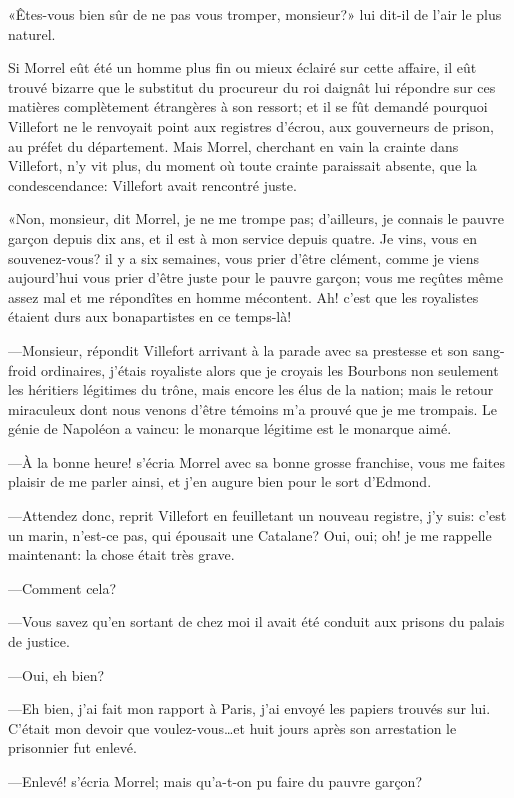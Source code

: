 «Êtes-vous bien sûr de ne pas vous tromper, monsieur?» lui dit-il de l'air le plus naturel.

Si Morrel eût été un homme plus fin ou mieux éclairé sur cette affaire, il eût trouvé bizarre que le substitut du procureur du roi daignât lui répondre sur ces matières complètement étrangères à son ressort; et il se fût demandé pourquoi Villefort ne le renvoyait point aux registres d'écrou, aux gouverneurs de prison, au préfet du département. Mais Morrel, cherchant en vain la crainte dans Villefort, n'y vit plus, du moment où toute crainte paraissait absente, que la condescendance: Villefort avait rencontré juste.

«Non, monsieur, dit Morrel, je ne me trompe pas; d'ailleurs, je connais le pauvre garçon depuis dix ans, et il est à mon service depuis quatre. Je vins, vous en souvenez-vous? il y a six semaines, vous prier d'être clément, comme je viens aujourd'hui vous prier d'être juste pour le pauvre garçon; vous me reçûtes même assez mal et me répondîtes en homme mécontent. Ah! c'est que les royalistes étaient durs aux bonapartistes en ce temps-là!

—Monsieur, répondit Villefort arrivant à la parade avec sa prestesse et son sang-froid ordinaires, j'étais royaliste alors que je croyais les Bourbons non seulement les héritiers légitimes du trône, mais encore les élus de la nation; mais le retour miraculeux dont nous venons d'être témoins m'a prouvé que je me trompais. Le génie de Napoléon a vaincu: le monarque légitime est le monarque aimé.

—À la bonne heure! s'écria Morrel avec sa bonne grosse franchise, vous me faites plaisir de me parler ainsi, et j'en augure bien pour le sort d'Edmond.

—Attendez donc, reprit Villefort en feuilletant un nouveau registre, j'y suis: c'est un marin, n'est-ce pas, qui épousait une Catalane? Oui, oui; oh! je me rappelle maintenant: la chose était très grave.

—Comment cela?

—Vous savez qu'en sortant de chez moi il avait été conduit aux prisons du palais de justice.

—Oui, eh bien?

—Eh bien, j'ai fait mon rapport à Paris, j'ai envoyé les papiers trouvés sur lui. C'était mon devoir que voulez-vous\dots et huit jours après son arrestation le prisonnier fut enlevé.

—Enlevé! s'écria Morrel; mais qu'a-t-on pu faire du pauvre garçon?

